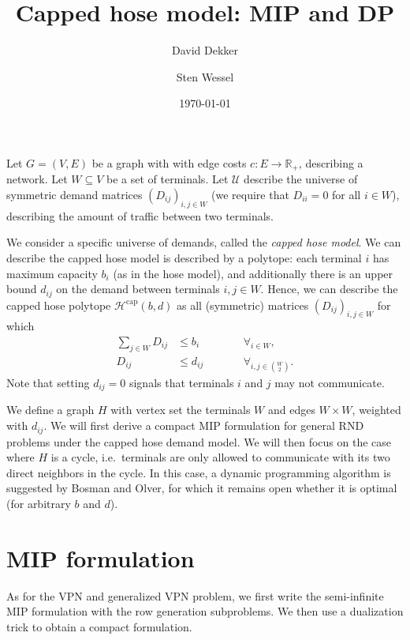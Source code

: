 \documentclass[11pt]{article}
\title{Capped hose model: MIP and DP}
\author{David Dekker \and Sten Wessel}
\date{\today}
\begin{document}
    \maketitle

    Let $G = (V, E)$ be a graph with with edge costs $c\colon E \to \mathbb R_+$, describing a network.
    Let $W \subseteq V$ be a set of terminals.
    Let $\mathcal U$ describe the universe of symmetric demand matrices $(D_{ij})_{i,j \in W}$ (we require that $D_{ii} = 0$ for all $i \in W$), describing the amount of traffic between two terminals.

    We consider a specific universe of demands, called the \emph{capped hose model}.
    We can describe the capped hose model is described by a polytope: each terminal $i$ has maximum capacity $b_i$ (as in the hose model), and additionally there is an upper bound $d_{ij}$ on the demand between terminals $i,j \in W$.
    Hence, we can describe the capped hose polytope $\mathcal H^\text{cap}(b, d)$ as all (symmetric) matrices $(D_{ij})_{i,j \in W}$ for which
    \[
        \begin{split}
            \sum_{j \in W} D_{ij} &\le b_i \qquad&&\forall_{i \in W}, \\
            D_{ij} &\le d_{ij} \qquad&&\forall_{i,j \in \binom W 2}.
        \end{split}
    \]
    Note that setting $d_{ij} = 0$ signals that terminals $i$ and $j$ may not communicate.

    We define a graph $H$ with vertex set the terminals $W$ and edges $W \times W$, weighted with $d_{ij}$.
    We will first derive a compact MIP formulation for general RND problems under the capped hose demand model.
    We will then focus on the case where $H$ is a cycle, i.e.\ terminals are only allowed to communicate with its two direct neighbors in the cycle.
    In this case, a dynamic programming algorithm is suggested by Bosman and Olver, for which it remains open whether it is optimal (for arbitrary $b$ and $d$).

    \section{MIP formulation}
    As for the VPN and generalized VPN problem, we first write the semi-infinite MIP formulation with the row generation subproblems.
    We then use a dualization trick to obtain a compact formulation.
\end{document}
